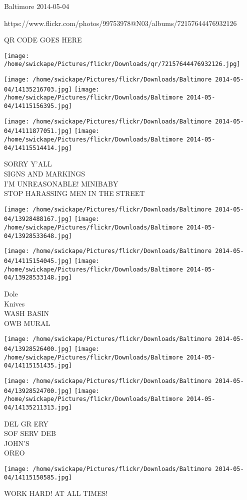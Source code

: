 \documentclass[10pt,letterpaper]{article}
\begin{document}
Baltimore 2014-05-04

https://www.flickr.com/photos/99753978@N03/albums/72157644476932126

QR CODE GOES HERE

\texttt{[image: /home/swickape/Pictures/flickr/Downloads/qr/72157644476932126.jpg]}
\pagebreak

\texttt{[image: /home/swickape/Pictures/flickr/Downloads/Baltimore 2014-05-04/14135216703.jpg]}
\texttt{[image: /home/swickape/Pictures/flickr/Downloads/Baltimore 2014-05-04/14115156395.jpg]}

\texttt{[image: /home/swickape/Pictures/flickr/Downloads/Baltimore 2014-05-04/14111877051.jpg]}
\texttt{[image: /home/swickape/Pictures/flickr/Downloads/Baltimore 2014-05-04/14115514414.jpg]}

SORRY Y'ALL\\
SIGNS AND MARKINGS\\
I'M UNREASONABLE! MINIBABY\\
STOP HARASSING MEN IN THE STREET\\
\pagebreak

\texttt{[image: /home/swickape/Pictures/flickr/Downloads/Baltimore 2014-05-04/13928488167.jpg]}
\texttt{[image: /home/swickape/Pictures/flickr/Downloads/Baltimore 2014-05-04/13928533648.jpg]}

\texttt{[image: /home/swickape/Pictures/flickr/Downloads/Baltimore 2014-05-04/14115154045.jpg]}
\texttt{[image: /home/swickape/Pictures/flickr/Downloads/Baltimore 2014-05-04/13928533148.jpg]}

Dole\\
Knives\\
WASH BASIN\\
OWB MURAL\\
\pagebreak

\texttt{[image: /home/swickape/Pictures/flickr/Downloads/Baltimore 2014-05-04/13928526400.jpg]}
\texttt{[image: /home/swickape/Pictures/flickr/Downloads/Baltimore 2014-05-04/14115151435.jpg]}

\texttt{[image: /home/swickape/Pictures/flickr/Downloads/Baltimore 2014-05-04/13928524700.jpg]}
\texttt{[image: /home/swickape/Pictures/flickr/Downloads/Baltimore 2014-05-04/14135211313.jpg]}

DEL GR ERY\\
SOF SERV DEB\\
JOHN'S\\
OREO\\
\pagebreak

\texttt{[image: /home/swickape/Pictures/flickr/Downloads/Baltimore 2014-05-04/14115150585.jpg]}

WORK HARD!  AT ALL TIMES!\\
\pagebreak
\end{document}
